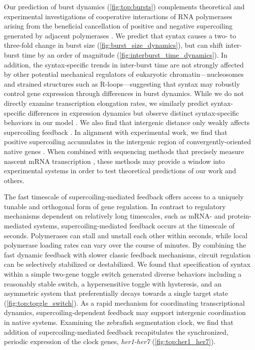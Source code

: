 \documentclass[11pt]{article} %
\begin{document}
Our prediction of burst dynamics (\cref{fig:top:bursts}) complements theoretical and experimental investigations of cooperative interactions of RNA polymerases arising from the beneficial cancellation of positive and negative supercoiling generated by adjacent polymerases \parencite{sevierCollectivePolymeraseDynamics2022,kimLongDistanceCooperativeAntagonistic2019}. We predict that syntax causes a two- to three-fold change in burst size (\cref{fig:burst_size_dynamics}), but can shift inter-burst time by an order of magnitude (\cref{fig:interburst_time_dynamics}). In addition, the syntax-specific trends in inter-burst time are not strongly affected by other potential mechanical regulators of eukaryotic chromatin---nucleosomes and strained structures such as R-loops---suggesting that syntax may robustly control gene expression through differences in burst dynamics.
While we do not directly examine transcription elongation rates, we similarly predict syntax-specific differences in expression dynamics but observe distinct syntax-specific behaviors in our model \parencite{sevierCollectivePolymeraseDynamics2022,tripathiDNASupercoilingmediatedCollective2021}.  We also find that intergenic distance only weakly affects supercoiling feedback \parencite{tripathiDNASupercoilingmediatedCollective2021}.
 In alignment with experimental work, we find that  positive supercoiling accumulates in the intergenic region of convergently-oriented native genes \parencite{guoHighresolutionGenomewideMapping2021}. When combined with sequencing methods that precisely measure nascent mRNA transcription \parencite{mellorInterleavedGenome2016}, these methods may provide a window into experimental systems in order to test theoretical predictions of our work and others.


 The fast timescale of supercoiling-mediated feedback offers access to a uniquely tunable and orthogonal form of gene regulation. In contrast to regulatory mechanisms dependent on relatively long timescales, such as mRNA- and protein-mediated systems, supercoiling-mediated feedback occurs at the timescale of seconds. Polymerases can stall and unstall each other within seconds, while local polymerase loading rates can vary over the course of minutes. By combining the fast dynamic feedback with slower classic feedback mechanisms, circuit regulation can be selectively stabilized or destabilized. We found that specification of syntax within a simple two-gene toggle switch generated diverse behaviors including a reasonably stable switch, a hypersensitive toggle with hysteresis, and an asymmetric system that preferentially decays towards a single target state (\cref{fig:top:toggle_switch}).
As a rapid mechanism for coordinating transcriptional dynamics, supercoiling-dependent feedback may support intergenic coordination in native systems. Examining the zebrafish segmentation clock, we find that addition of supercoiling-mediated feedback recapitulates the synchronized, periodic expression of the clock genes, \textit{her1-her7} (\cref{fig:top:her1_her7}). 
\end{document}
